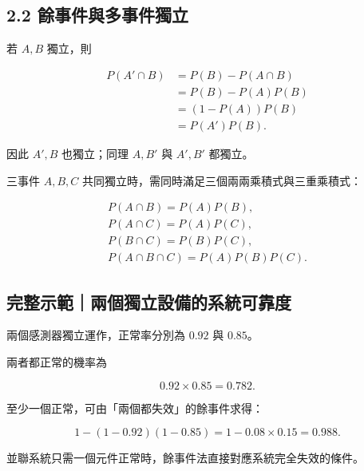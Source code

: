 \documentclass[11pt,a4paper]{article}
\begin{document}
\subsection{2.2 餘事件與多事件獨立}\label{ux9918ux4e8bux4ef6ux8207ux591aux4e8bux4ef6ux7368ux7acb}

若 \(A,B\) 獨立，則

\[
\begin{aligned}
P(A'\cap B)
&=P(B)-P(A\cap B)\\
&=P(B)-P(A)P(B)\\
&=(1-P(A))P(B)\\
&=P(A')P(B).
\end{aligned}
\]

因此 \(A',B\) 也獨立；同理 \(A,B'\) 與 \(A',B'\) 都獨立。

三事件 \(A,B,C\) 共同獨立時，需同時滿足三個兩兩乘積式與三重乘積式：

\[
\begin{gathered}
P(A\cap B)=P(A)P(B),\\
P(A\cap C)=P(A)P(C),\\
P(B\cap C)=P(B)P(C),\\
P(A\cap B\cap C)=P(A)P(B)P(C).
\end{gathered}
\]

\begin{HandoutWorkedExample}

\subsection{完整示範｜兩個獨立設備的系統可靠度}\label{ux5b8cux6574ux793aux7bc4ux5169ux500bux7368ux7acbux8a2dux5099ux7684ux7cfbux7d71ux53efux9760ux5ea6}

兩個感測器獨立運作，正常率分別為 \(0.92\) 與 \(0.85\)。

兩者都正常的機率為

\[
0.92\times0.85=\boxed{0.782}.
\]

至少一個正常，可由「兩個都失效」的餘事件求得：

\[
1-(1-0.92)(1-0.85)
=1-0.08\times0.15
=\boxed{0.988}.
\]

並聯系統只需一個元件正常時，餘事件法直接對應系統完全失效的條件。

\end{HandoutWorkedExample}
\end{document}
